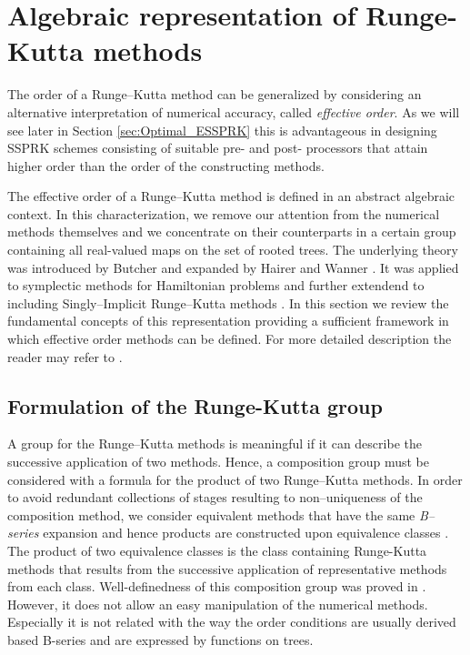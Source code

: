 \section{Algebraic representation of Runge-Kutta methods}\label{sec:Algebraic_RK}

\indent The order of a Runge--Kutta method can be generalized by considering an alternative interpretation of numerical accuracy, called \emph{effective order}. As we will see later in Section \ref{sec:Optimal_ESSPRK} this is advantageous in designing SSPRK schemes consisting of suitable pre- and post- processors that attain higher order than the order of the constructing methods. 

The effective order of a Runge--Kutta method is defined in an abstract algebraic context. In this characterization, we remove our attention from the numerical methods themselves and we concentrate on their counterparts in a certain group containing all real-valued maps on the set of rooted trees. The underlying theory was introduced by Butcher \cite{Butcher1969} and expanded by Hairer and Wanner \cite{Hairer1974}. It was applied to symplectic methods for Hamiltonian problems \cite{Lopez1996} and further extendend to including Singly--Implicit Runge--Kutta methods \cite{Butcher1997, Butcher1999}. In this section we review the fundamental concepts of this representation providing a sufficient framework in which effective order methods can be defined. For more detailed description the reader may refer to \cite{Butcher2008_book, Butcher1972}.

\subsection{Formulation of the Runge-Kutta group}\label{sec:RK_group}

\indent A group for the Runge--Kutta methods is meaningful if it can describe the successive application of two methods. Hence, a composition group must be considered with a formula for the product of two Runge--Kutta methods. In order to avoid redundant collections of stages resulting to non--uniqueness of the composition method, we consider equivalent methods that have the same \emph{B--series} expansion and hence products are constructed upon equivalence classes \cite{Butcher1987_book, Butcher2008_book}. The product of two equivalence classes is the class containing Runge-Kutta methods that results from the successive application of representative methods from each class.  Well-definedness of this composition group was proved in \cite{Butcher1972}. However, it does not allow an easy manipulation of the numerical methods. Especially it is not related with the way the order conditions are usually derived based B-series and are expressed by functions on trees. 

